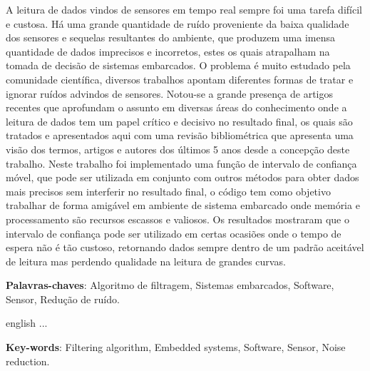 \setlength{\absparsep}{18pt} %
\begin{resumo}
	A leitura de dados vindos de sensores em tempo real sempre foi uma tarefa difícil e custosa. Há uma grande quantidade de ruído proveniente da baixa qualidade dos sensores e sequelas resultantes do ambiente, que produzem uma imensa quantidade de dados imprecisos e incorretos, estes os quais atrapalham na tomada de decisão de sistemas embarcados. O problema é muito estudado pela comunidade científica, diversos trabalhos apontam diferentes formas de tratar e ignorar ruídos advindos de sensores. Notou-se a grande presença de artigos recentes que aprofundam o assunto em diversas áreas do conhecimento onde a leitura de dados tem um papel crítico e decisivo no resultado final, os quais são tratados e apresentados aqui com uma revisão bibliométrica que apresenta uma visão dos termos, artigos e autores dos últimos 5 anos desde a concepção deste trabalho. Neste trabalho foi implementado uma função de intervalo de confiança móvel, que pode ser utilizada em conjunto com outros métodos para obter dados mais precisos sem interferir no resultado final, o código tem como objetivo trabalhar de forma amigável em ambiente de sistema embarcado onde memória e processamento são recursos escassos e valiosos. Os resultados mostraram que o intervalo de confiança pode ser utilizado em certas ocasiões onde o tempo de espera não é tão custoso, retornando dados sempre dentro de um padrão aceitável de leitura mas perdendo qualidade na leitura de grandes curvas.
	



	\textbf{Palavras-chaves}: Algoritmo de filtragem, Sistemas embarcados, Software, Sensor, Redução de ruído.
\end{resumo}

\begin{resumo}[Abstract]
	\begin{otherlanguage*}{english}
		...
		\vspace{\onelineskip}

		\noindent
		\textbf{Key-words}: Filtering algorithm, Embedded systems, Software, Sensor, Noise reduction.
	\end{otherlanguage*}
\end{resumo}


